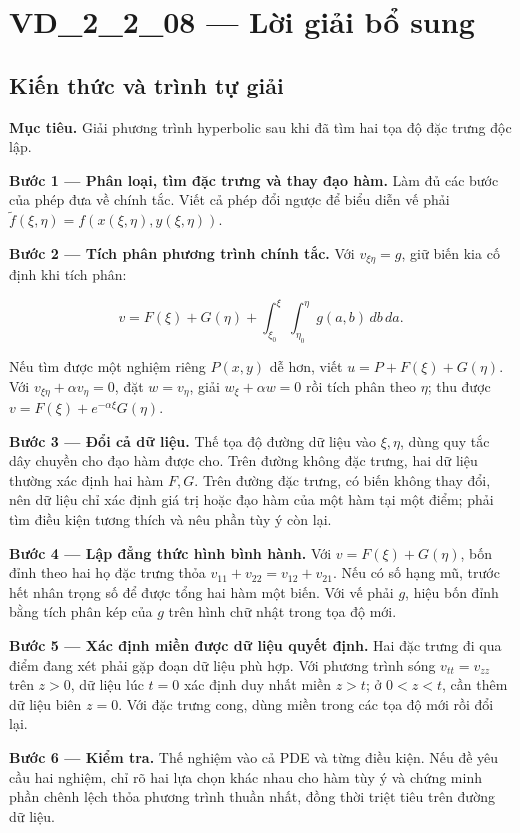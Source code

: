 \documentclass[10pt,a4paper]{article}
\begin{document}
\section*{VD\_2\_2\_08 — Lời giải bổ sung}
\subsection*{Kiến thức và trình tự giải}
\textbf{Mục tiêu.} Giải phương trình hyperbolic sau khi đã tìm hai tọa độ đặc trưng độc lập.

\textbf{Bước 1 — Phân loại, tìm đặc trưng và thay đạo hàm.} Làm đủ các bước của phép đưa về chính tắc. Viết cả phép đổi ngược để biểu diễn vế phải $\widetilde f(\xi,\eta)=f(x(\xi,\eta),y(\xi,\eta))$.

\textbf{Bước 2 — Tích phân phương trình chính tắc.} Với $v_{\xi\eta}=g$, giữ biến kia cố định khi tích phân:


\[
v=F(\xi)+G(\eta)+\int_{\xi_0}^{\xi}\int_{\eta_0}^{\eta}g(a,b)\,db\,da.
\]


Nếu tìm được một nghiệm riêng $P(x,y)$ dễ hơn, viết $u=P+F(\xi)+G(\eta)$. Với $v_{\xi\eta}+\alpha v_\eta=0$, đặt $w=v_\eta$, giải $w_\xi+\alpha w=0$ rồi tích phân theo $\eta$; thu được $v=F(\xi)+e^{-\alpha\xi}G(\eta)$.

\textbf{Bước 3 — Đổi cả dữ liệu.} Thế tọa độ đường dữ liệu vào $\xi,\eta$, dùng quy tắc dây chuyền cho đạo hàm được cho. Trên đường không đặc trưng, hai dữ liệu thường xác định hai hàm $F,G$. Trên đường đặc trưng, có biến không thay đổi, nên dữ liệu chỉ xác định giá trị hoặc đạo hàm của một hàm tại một điểm; phải tìm điều kiện tương thích và nêu phần tùy ý còn lại.

\textbf{Bước 4 — Lập đẳng thức hình bình hành.} Với $v=F(\xi)+G(\eta)$, bốn đỉnh theo hai họ đặc trưng thỏa $v_{11}+v_{22}=v_{12}+v_{21}$. Nếu có số hạng mũ, trước hết nhân trọng số để được tổng hai hàm một biến. Với vế phải $g$, hiệu bốn đỉnh bằng tích phân kép của $g$ trên hình chữ nhật trong tọa độ mới.

\textbf{Bước 5 — Xác định miền được dữ liệu quyết định.} Hai đặc trưng đi qua điểm đang xét phải gặp đoạn dữ liệu phù hợp. Với phương trình sóng $v_{tt}=v_{zz}$ trên $z>0$, dữ liệu lúc $t=0$ xác định duy nhất miền $z>t$; ở $0<z<t$, cần thêm dữ liệu biên $z=0$. Với đặc trưng cong, dùng miền trong các tọa độ mới rồi đổi lại.

\textbf{Bước 6 — Kiểm tra.} Thế nghiệm vào cả PDE và từng điều kiện. Nếu đề yêu cầu hai nghiệm, chỉ rõ hai lựa chọn khác nhau cho hàm tùy ý và chứng minh phần chênh lệch thỏa phương trình thuần nhất, đồng thời triệt tiêu trên đường dữ liệu.
\end{document}
